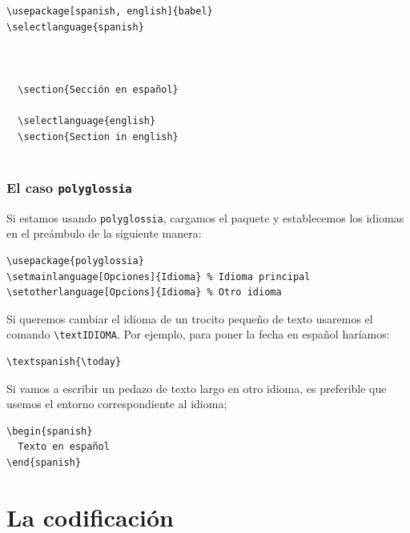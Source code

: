\begin{lstlisting}[language={[latex]tex}]
\usepackage[spanish, english]{babel}
\selectlanguage{spanish}



  \section{Sección en español}

  \selectlanguage{english}
  \section{Section in english}


\end{lstlisting}

\subsubsection{El caso \texttt{polyglossia}}

Si estamos usando \lstinline!polyglossia!, cargamos el paquete y establecemos los
idiomas en el preámbulo de la siguiente manera:

\begin{lstlisting}[language={[latex]tex}]
\usepackage{polyglossia}
\setmainlanguage[Opciones]{Idioma} % Idioma principal
\setotherlanguage[Opcions]{Idioma} % Otro idioma
\end{lstlisting}

Si queremos cambiar el idioma de un trocito pequeño de texto usaremos el
comando \lstinline!\textIDIOMA!. Por ejemplo, para poner la fecha en español
haríamos:

\begin{lstlisting}[language={[latex]tex}]
\textspanish{\today}
\end{lstlisting}

Si vamos a escribir un pedazo de texto largo en otro idioma, es
preferible que usemos el entorno correspondiente al idioma;

\begin{lstlisting}[language={[latex]tex}]
\begin{spanish}
  Texto en español
\end{spanish}
\end{lstlisting}

\section{La codificación}\label{sec:codificacion}

